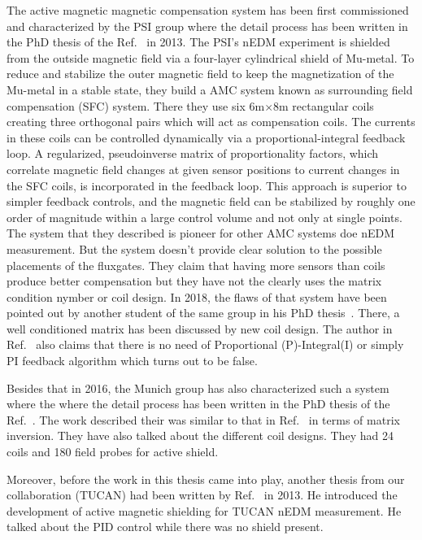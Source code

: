The active magnetic magnetic compensation system has been first commissioned and characterized by the PSI group where the detail process has been written in the PhD thesis of the Ref.~\cite{bea} in 2013. The PSI's nEDM experiment is shielded from the outside magnetic field via a four-layer cylindrical shield
of Mu-metal. To reduce and stabilize the outer magnetic field to keep the magnetization of the Mu-metal in a stable state, they build a AMC system known as surrounding field compensation (SFC) system. There they use 
six 6m$\times$8m rectangular coils creating three orthogonal pairs which will act as compensation coils. The currents in these coils
can be controlled dynamically via a proportional-integral feedback loop. A regularized, pseudoinverse matrix of proportionality factors, which correlate magnetic field changes at given sensor positions to current changes in the SFC coils, is incorporated in the feedback loop. This approach is superior to simpler feedback controls, and the magnetic field can be stabilized
by roughly one order of magnitude within a large control volume and not only at single points. The system that they described is pioneer for other AMC systems doe nEDM measurement. But the system doesn't provide clear solution to the possible placements of the fluxgates. They claim that having more sensors than coils produce better compensation but they have not the clearly uses the matrix condition nymber or coil design. In 2018, the flaws of that system have been pointed out by another student of the same group in his PhD thesis~\cite{rawlik}. There, a well conditioned matrix has been discussed by new coil design. The author in Ref.~\cite{rawlik} also claims that there is no need of Proportional (P)-Integral(I) or simply PI feedback algorithm which turns out to be false.

Besides that in 2016, the Munich group has also characterized such a system where the where the detail process has been written in the PhD thesis of the Ref.~\cite{lins}. The work described their was similar to that in Ref.~\cite{bea} in terms of matrix inversion. They have also talked about the different coil designs. They had 24 coils and 180 field probes for active shield.

Moreover, before the work in this thesis came into play, another thesis from our collaboration (TUCAN) had been written by Ref.~\cite{mike} in 2013. He introduced the development of active magnetic shielding for TUCAN nEDM measurement. He talked about the PID control while there was no shield present.


